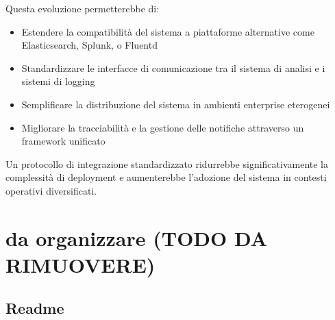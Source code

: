 \documentclass[12pt]{report}
\begin{document}
Questa evoluzione permetterebbe di:
\begin{itemize}
    \item Estendere la compatibilità del sistema a piattaforme alternative come Elasticsearch, Splunk, o Fluentd
    \item Standardizzare le interfacce di comunicazione tra il sistema di analisi e i sistemi di logging
    \item Semplificare la distribuzione del sistema in ambienti enterprise eterogenei
    \item Migliorare la tracciabilità e la gestione delle notifiche attraverso un framework unificato
\end{itemize}

Un protocollo di integrazione standardizzato ridurrebbe significativamente la complessità di deployment e aumenterebbe l'adozione del sistema in contesti operativi diversificati.



\chapter{da organizzare (TODO DA RIMUOVERE)}
\label{chap:da_organizzare}

\section{Readme}
\label{sec:readme}
\end{document}
